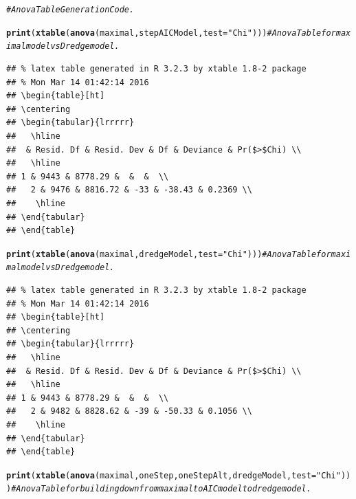 \documentclass{article}\usepackage[]{graphicx}\usepackage[]{color}
\makeatletter
\newcommand{\hlstr}[1]{\textcolor[rgb]{0.192,0.494,0.8}{#1}}%
\newcommand{\hlcom}[1]{\textcolor[rgb]{0.678,0.584,0.686}{\textit{#1}}}%
\newcommand{\hlstd}[1]{\textcolor[rgb]{0.345,0.345,0.345}{#1}}%
\newcommand{\hlkwc}[1]{\textcolor[rgb]{0.333,0.667,0.333}{#1}}%
\newcommand{\hlkwd}[1]{\textcolor[rgb]{0.737,0.353,0.396}{\textbf{#1}}}%
\newenvironment{kframe}{%
 \def\at@end@of@kframe{}%
 \ifinner\ifhmode%
  \def\at@end@of@kframe{\end{minipage}}%
  \begin{minipage}{\columnwidth}%
 \fi\fi%
 \def\FrameCommand##1{\hskip\@totalleftmargin \hskip-\fboxsep
 \colorbox{shadecolor}{##1}\hskip-\fboxsep
     \hskip-\linewidth \hskip-\@totalleftmargin \hskip\columnwidth}%
 \MakeFramed {\advance\hsize-\width
   \@totalleftmargin\z@ \linewidth\hsize
   \@setminipage}}%
 {\par\unskip\endMakeFramed%
 \at@end@of@kframe}
\newenvironment{knitrout}{}{} %
\makeatother
\begin{document}
\begin{knitrout}
\color{fgcolor}\begin{kframe}
\begin{alltt}
\hlcom{#Anova Table Generation Code. }

\hlkwd{print}\hlstd{(}\hlkwd{xtable}\hlstd{(}\hlkwd{anova}\hlstd{(maximal, stepAICModel,} \hlkwc{test}\hlstd{=}\hlstr{"Chi"}\hlstd{)))} \hlcom{#Anova Table for maximal model vs Dredge model. }
\end{alltt}
\begin{verbatim}
## % latex table generated in R 3.2.3 by xtable 1.8-2 package
## % Mon Mar 14 01:42:14 2016
## \begin{table}[ht]
## \centering
## \begin{tabular}{lrrrrr}
##   \hline
##  & Resid. Df & Resid. Dev & Df & Deviance & Pr($>$Chi) \\ 
##   \hline
## 1 & 9443 & 8778.29 &  &  &  \\ 
##   2 & 9476 & 8816.72 & -33 & -38.43 & 0.2369 \\ 
##    \hline
## \end{tabular}
## \end{table}
\end{verbatim}
\begin{alltt}
\hlkwd{print}\hlstd{(}\hlkwd{xtable}\hlstd{(}\hlkwd{anova}\hlstd{(maximal, dredgeModel,} \hlkwc{test}\hlstd{=}\hlstr{"Chi"}\hlstd{)))} \hlcom{#Anova Table for maximal model vs Dredge model. }
\end{alltt}
\begin{verbatim}
## % latex table generated in R 3.2.3 by xtable 1.8-2 package
## % Mon Mar 14 01:42:14 2016
## \begin{table}[ht]
## \centering
## \begin{tabular}{lrrrrr}
##   \hline
##  & Resid. Df & Resid. Dev & Df & Deviance & Pr($>$Chi) \\ 
##   \hline
## 1 & 9443 & 8778.29 &  &  &  \\ 
##   2 & 9482 & 8828.62 & -39 & -50.33 & 0.1056 \\ 
##    \hline
## \end{tabular}
## \end{table}
\end{verbatim}
\begin{alltt}
\hlkwd{print}\hlstd{(}\hlkwd{xtable}\hlstd{(}\hlkwd{anova}\hlstd{(maximal, oneStep, oneStepAlt, dredgeModel,} \hlkwc{test}\hlstd{=}\hlstr{"Chi"}\hlstd{)))} \hlcom{#Anova Table for building down from maximal to AICmodel to dredge model.  }

\end{alltt}
\end{kframe}
\end{knitrout}
\end{document}
